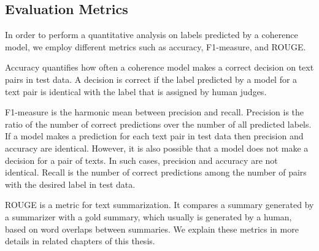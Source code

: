\subsection{Evaluation Metrics}

In order to perform a quantitative analysis on labels predicted by a coherence model, we employ  different metrics such as accuracy, F1-measure, and ROUGE. 

Accuracy quantifies how often a coherence model makes a correct decision on text pairs in test data.
A decision is correct if the label predicted by a model for a text pair is identical with the label that is assigned by human judges.

F1-measure is the harmonic mean between precision and recall. 
Precision is the ratio of the number of correct predictions over the number of all predicted labels. 
If a model makes a prediction for each text pair in test data then precision and accuracy are identical. 
However, it is also possible that a model does not make a decision for a pair of texts. In such cases, precision and accuracy are not identical.    
Recall is the number of correct predictions among the number of pairs with the desired label in test data. 

ROUGE is a metric for text summarization. It compares a summary generated by a summarizer with a gold summary, which usually is generated by a human, based on word overlaps between summaries. 
We explain these metrics in more details in related chapters of this thesis.


